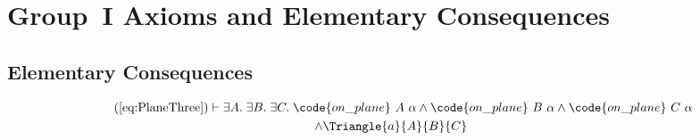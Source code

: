 \chapter{Group~I Axioms and Elementary Consequences}\label{app:group1}

\section{Elementary Consequences}
\begin{multline}
  \tag{\ref{eq:PlaneThree}}
  \vdash\exists A.\;\exists B.\;\exists C.\;\code{on\_plane}\ A\ \alpha\wedge\code{on\_plane}\ B\ \alpha\wedge\code{on\_plane}\ C\ \alpha\\
  \wedge \Triangle{a}{A}{B}{C}
\end{multline}

